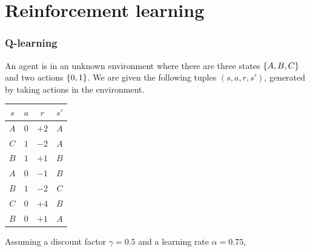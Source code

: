 \documentclass[11pt, a4paper]{article}
\begin{document}
\newpage

\part{Reinforcement learning}

\section{Q-learning}

An agent is in an unknown environment where there are three states $\{A, B, C\}$ and two actions $\{0, 1\}$. We are given the following tuples $(s, a, r, s')$, generated by taking actions in the environment.

\begin{table}[h]
    \centering
    \begin{tabular}{cccc}
        \toprule
        $s$ & $a$ & $r$ & $s'$ \\
        \midrule
        $A$ & $0$ & $+2$ & $A$ \\
        $C$ & $1$ & $-2$ & $A$ \\
        $B$ & $1$ & $+1$ & $B$ \\
        $A$ & $0$ & $-1$ & $B$ \\
        $B$ & $1$ & $-2$ & $C$ \\
        $C$ & $0$ & $+4$ & $B$ \\
        $B$ & $0$ & $+1$ & $A$ \\
        \bottomrule
    \end{tabular}
\end{table}

Assuming a discount factor $\gamma = 0.5$ and a learning rate $\alpha = 0.75$,
\end{document}
